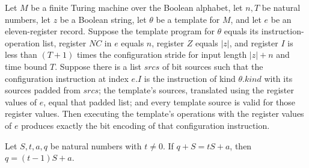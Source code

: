 \begin{theorem}
\label{Complexity.UTab.prog_instr_bits}
\leanok
{}
Let $M$ be a finite Turing machine over the Boolean alphabet, let $n,T$ be natural
numbers, let $z$ be a Boolean string, let $\theta$ be a template for $M$, and let $e$ be
an eleven-register record. Suppose the template program for $\theta$ equals its
instruction-operation list, register $NC$ in $e$ equals $n$, register $Z$ equals $|z|$,
and register $I$ is less than $(T+1)$ times the configuration stride for input length
$|z|+n$ and time bound $T$. Suppose there is a list $srcs$ of bit sources such that the
configuration instruction at index $e.I$ is the instruction of kind $\theta.kind$ with
its sources padded from $srcs$; the template's sources, translated using the register
values of $e$, equal that padded list; and every template source is valid for those
register values. Then executing the template's operations with the register values of
$e$ produces exactly the bit encoding of that configuration instruction.
\end{theorem}

\begin{theorem}
\label{Complexity.UTab.prev_eq}
\leanok
{}
Let $S,t,a,q$ be natural numbers with $t\ne 0$. If $q+S=tS+a$, then $q=(t-1)S+a$.
\end{theorem}

